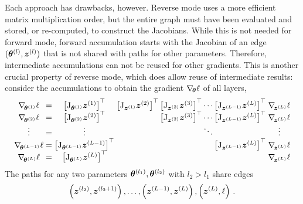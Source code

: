 Each approach has drawbacks, however. Reverse mode uses a more efficient matrix
multiplication order, but the entire graph must have been evaluated and stored,
or re-computed, to construct the Jacobians. While this is not needed for forward
mode, forward accumulation starts with the Jacobian of an edge $({\bm{\theta}}^{(l)},
{\bm{z}}^{(l)})$ that is not shared with paths for other parameters. Therefore,
intermediate accumulations can not be reused for other gradients. This is
another crucial property of reverse mode, which does allow reuse of intermediate
results: consider the accumulations to obtain the gradient $\nabla_{\!{{\bm{\theta}}}}\ell$
of all layers,
\begin{align*}
  \setlength{\arraycolsep}{1.4pt} %
  \begin{array}{cccrc}
    \grad{\vtheta^{(1)}}\ell
    &
      =
    &
      \left[
      \jac_{\vtheta^{(1)}} \vz^{(1)}
      \right]^{\top}
    &
      \left[
      \jac_{\vz^{(1)}} \vz^{(2)}
      \right]^{\top}
      \left[
      \jac_{\vz^{(2)}} \vz^{(3)}
      \right]^{\top}
      \cdots
      \left[
      \jac_{\vz^{(L-1)}} \vz^{(L)}
      \right]^{\top}
    &
      \grad{\vz^{(L)}} \ell
    \\
    \grad{\vtheta^{(2)}}\ell
    &
      =
    &
      \left[
      \jac_{\vtheta^{(2)}} \vz^{(2)}
      \right]^{\top}
    &
      \left[
      \jac_{\vz^{(2)}} \vz^{(3)}
      \right]^{\top}
      \cdots
      \left[
      \jac_{\vz^{(L-1)}} \vz^{(L)}
      \right]^{\top}
    &
      \grad{\vz^{(L)}} \ell
    \\
    \vdots
    &
      =
    &
      \vdots
    &
      \ddots
      \phantom{
      \left[
      \jac_{\vz^{(L-1)}} \vz^{(L)}
      \right]^{\top}
      }
    &
      \vdots
    \\
    \grad{\vtheta^{(L-1)}}\ell
    &
      =
    &
      \left[
      \jac_{\vtheta^{(L-1)}} \vz^{(L-1)}
      \right]^{\top}
    &
      \left[
      \jac_{\vz^{(L-1)}} \vz^{(L)}
      \right]^{\top}
    &
      \grad{\vz^{(L)}} \ell
    \\
    \grad{\vtheta^{(L)}}\ell
    &
      =
    &
      \left[
      \jac_{\vtheta^{(L)}} \vz^{(L)}
      \right]^{\top}
    &
    &
      \grad{\vz^{(L)}} \ell
  \end{array}
\end{align*}
The paths for any two parameters ${\bm{\theta}}^{(l_1)}, {\bm{\theta}}^{(l_2)}$ with $l_2 >
l_1$ share edges
\begin{align*}
  \left( {\bm{z}}^{(l_2)}, {\bm{z}}^{(l_2+1)} \right),
  \dots,
  \left( {\bm{z}}^{(L-1)}, {\bm{z}}^{(L)} \right),
  \left( {\bm{z}}^{(L)}, \ell \right)\,.
\end{align*}
